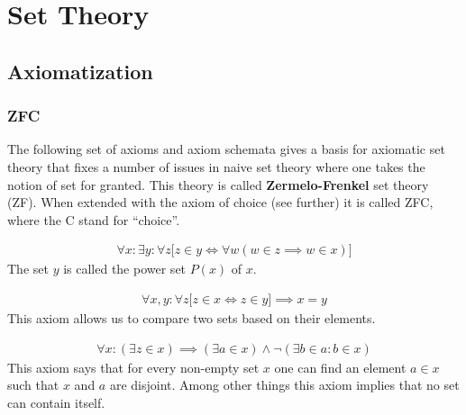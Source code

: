 \chapter{Set Theory}

\section{Axiomatization}\label{section:axiomatization}
\subsection{ZFC}

    The following set of axioms and axiom schemata gives a basis for axiomatic set theory that fixes a number of issues in naive set theory where one takes the notion of set for granted. This theory is called \textbf{Zermelo-Frenkel} set theory (ZF). When extended with the axiom of choice (see further) it is called ZFC, where the C stand for ``choice''.

    \begin{axiom}\label{set:power_set_axiom}
        \begin{gather}
            \forall x:\exists y:\forall z\big[z\in y\iff\forall w(w\in z\implies w\in x)\big]
        \end{gather}
        The set $y$ is called the power set $P(x)$ of $x$.
    \end{axiom}

    \begin{axiom}[Extensionality]
        \begin{gather}
            \forall x,y:\forall z\big[z\in x\iff z\in y\big]\implies x=y
        \end{gather}
        This axiom allows us to compare two sets based on their elements.
    \end{axiom}

    \begin{axiom}
        \begin{gather}
            \forall x:(\exists z\in x)\implies(\exists a\in x)\land\neg(\exists b\in a:b\in x)
        \end{gather}
        This axiom says that for every non-empty set $x$ one can find an element $a\in x$ such that $x$ and $a$ are disjoint. Among other things this axiom implies that no set can contain itself.
    \end{axiom}

